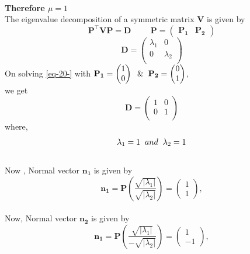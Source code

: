 \documentclass[journal,12pt,twocolumn]{IEEEtran}
\newcommand{\myvec}[1]{\ensuremath{\begin{pmatrix}#1\end{pmatrix}}}
\let\vec\mathbf
\let\vec\mathbf
\begin{document}
\\
\textbf{Therefore $\mu = 1$}\\
 The eigenvalue decomposition of a symmetric matrix $\vec{V}$ is given by
  \begin{equation}
  \vec{P}^{\top}\vec{V}\vec{P} = \vec{D} \hspace{1cm} 
  \label{eq-20-} 
  \vec{P} = \myvec{\vec{P_1} & \vec{P_2}}                                                    
  \end{equation}
\begin{equation}
 \vec{D} = \begin{pmatrix}
          \lambda_1 & 0 \\
          0 & \lambda_2 \\
          \end{pmatrix}
  \end{equation}
  On solving \eqref{eq-20-} with $\vec{P_1} = \myvec{1 \\ 0} \hspace{2mm} \& \hspace{2mm} \vec{P_2} = \myvec{0 \\ 1}$,\\ we get
  \begin{equation}
 \vec{D} = \begin{pmatrix}
         1 & 0 \\                                                                              0 & 1 \\                                                                              
 \end{pmatrix}                                                                      
\end{equation}
where,
  \begin{equation}
  \lambda_1 = 1 \hspace{2mm} and \hspace{2mm} \lambda_2 = 1
  \end{equation}
\\
Now ,
 Normal vector  $\vec{n_1}$ is given by                                              \begin{equation}                                                                    
\vec{n_1} = \vec{P}(\frac{\sqrt{|\lambda_1|}}{\sqrt{|\lambda_2|}} ) = \myvec{1 \\1},
\end{equation}
\\
Now,
 Normal vector  $\vec{n_2}$ is given by                                              \begin{equation}                                                                    
\vec{n_1} = \vec{P}(\frac{\sqrt{|\lambda_1|}}{ - \sqrt{|\lambda_2|}} ) = \myvec{1 \\-1},
\end{equation}
\end{document}

